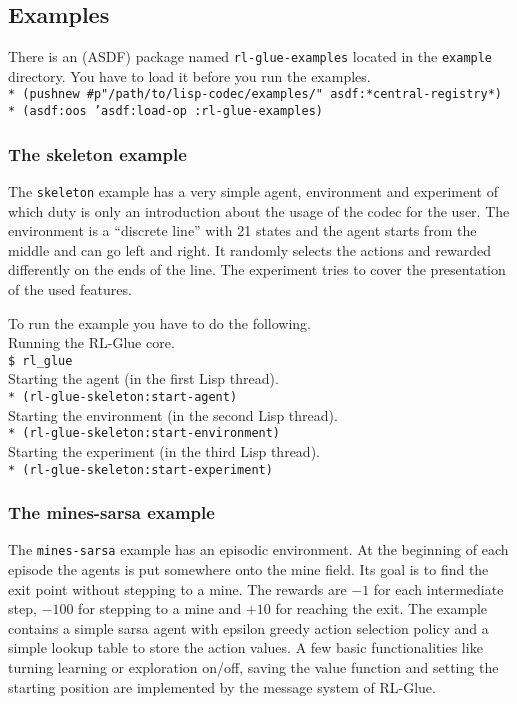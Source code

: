 \documentclass[11pt,a4paper,dvipdfm]{article}
\newcommand{\prompttext}[1]{\texttt{#1}}
\newcommand{\shprompt}[1]{\prompttext{\$ #1}}
\newcommand{\lispprompt}[1]{\prompttext{* #1}}
\begin{document}
\subsection{Examples}
\hypertarget{examples}{}

There is an (ASDF) package named \prompttext{rl-glue-examples} located
in the \prompttext{example} directory. You have to load it before you
run the examples. \\
\lispprompt{(pushnew \#p"/path/to/lisp-codec/examples/" asdf:*central-registry*)} \\
\lispprompt{(asdf:oos 'asdf:load-op :rl-glue-examples)}

\subsubsection{The skeleton example}

The \prompttext{skeleton} example has a very simple agent, environment
and experiment of which duty is only an introduction about the usage of
the codec for the user. The environment is a ``discrete line'' with 21
states and the agent starts from the middle and can go left and right.
It randomly selects the actions and rewarded differently on the ends of
the line. The experiment tries to cover the presentation of the used
features.

To run the example you have to do the following. \\
Running the RL-Glue core. \\
\shprompt{rl\_glue} \\
Starting the agent (in the first Lisp thread). \\
\lispprompt{(rl-glue-skeleton:start-agent)} \\
Starting the environment (in the second Lisp thread). \\
\lispprompt{(rl-glue-skeleton:start-environment)} \\
Starting the experiment (in the third Lisp thread). \\
\lispprompt{(rl-glue-skeleton:start-experiment)}

\subsubsection{The mines-sarsa example}

The \prompttext{mines-sarsa} example has an episodic environment. At the
beginning of each episode the agents is put somewhere onto the mine field.
Its goal is to find the exit point without stepping to a mine. The rewards
are $-1$ for each intermediate step, $-100$ for stepping to a mine and $+10$
for reaching the exit. The example contains a simple sarsa agent with epsilon
greedy action selection policy and a simple lookup table to store the action
values. A few basic functionalities like turning learning or exploration
on/off, saving the value function and setting the starting position are
implemented by the message system of RL-Glue.
\end{document}
